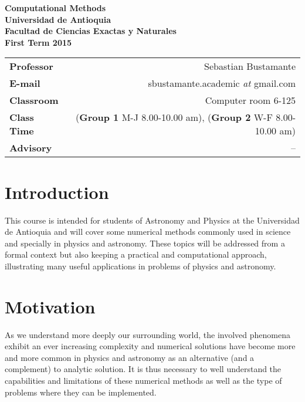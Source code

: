 \documentclass[a4,useAMS,usenatbib,usegraphicx,12pt]{article}
\begin{document}
\begin{flushleft}
  \sffamily\bfseries
  {\Large Computational Methods}\LOGO\\
  Universidad de Antioquia\\
  Facultad de Ciencias Exactas y Naturales\\
  First Term 2015
\end{flushleft}

\hrulefill\par

\vspace{1cm}
\begin{tabular}{L!{\VRule}R}
\bf Professor		& Sebastian Bustamante\\
\bf E-mail		& sbustamante.academic \textit{at} gmail.com\\
\bf Classroom		& Computer room 6-125\\
\bf Class Time		& (\textbf{Group 1} M-J 8.00-10.00 am), (\textbf{Group 2} W-F 8.00-10.00 am) \\
\bf Advisory		& --
\end{tabular}


\section*{Introduction}

This course is intended for students of Astronomy and Physics at the Universidad 
de Antioquia and will cover some numerical methods commonly used in science and 
specially in physics and astronomy. These topics will be addressed from a formal 
context but also keeping a practical and computational approach, illustrating 
many useful applications in problems of physics and astronomy.

\section*{Motivation}

As we understand more deeply our surrounding world, the involved phenomena
exhibit an ever increasing complexity and numerical solutions have become 
more and more common in physics and astronomy as an alternative (and a complement) 
to analytic solution. It is thus necessary to well understand the capabilities 
and limitations of these numerical methods as well as the type
of problems where they can be implemented.
\end{document}
